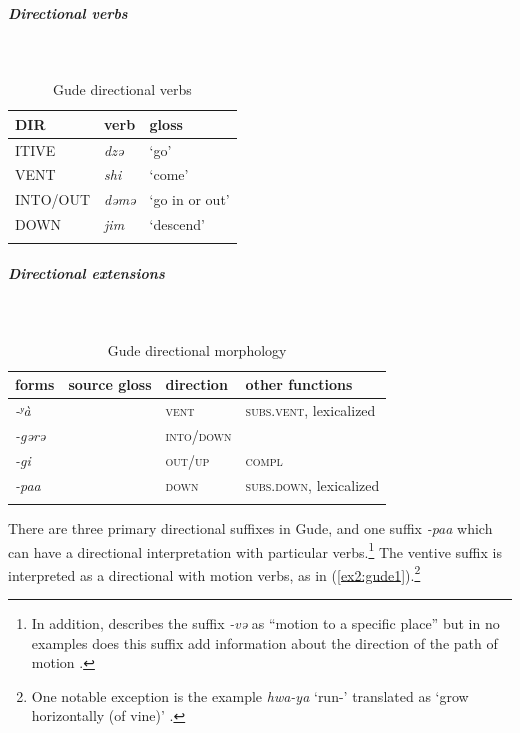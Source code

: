 \subparagraph{Directional verbs}~

\begin{table}[H]
	\caption{Gude directional verbs} 
	\label{tab:gude}
	\begin{tabular}{lll} %
		\lsptoprule
		DIR & verb & gloss   \\ %
		\midrule
		ITIVE & \textit{dzə} & `go' \\
		VENT & \textit{shi} & `come' \\
		INTO/OUT & \textit{dəmə} & `go in or out' \\
		DOWN & \textit{jim} & `descend' \\
		\lspbottomrule
	\end{tabular}
\end{table}

\subparagraph{Directional extensions}~

\begin{table}[H]
	\caption{Gude directional morphology}
	\label{tab:gudeV}
	\begin{tabular}{llll} %
		\lsptoprule
		forms & source gloss & direction  & other functions  \\ %
		\midrule
		\textit{-ʸà}  &   & \textsc{vent}   &   \textsc{subs.vent}, lexicalized  \\
		\textit{-gərə}  &    &   \textsc{into/down} &   \\
		\textit{-gi}  &   &   \textsc{out/up}  &  \textsc{compl}   \\
		\textit{-paa}  &   & \textsc{down}   &  \textsc{subs.down}, lexicalized  \\
		\lspbottomrule
	\end{tabular}
\end{table} 

There are three primary directional suffixes in Gude, and one suffix \textit{-paa} which can have a directional interpretation with particular verbs.\footnote{In addition, \citet[99]{hoskinsonGrammarDictionaryGude1983} describes the suffix \textit{-və} as ``motion to a specific place'' but in no examples does this suffix add information about the direction of the path of motion \citep[cf.][360--361]{schuhChadicCornucopia2017}.} The ventive suffix is interpreted as a directional with motion verbs, as in (\ref{ex2:gude1}).\footnote{One notable exception is the example \textit{hwa-ya} `run-' translated as `grow horizontally (of vine)' \citep[203]{hoskinsonGrammarDictionaryGude1983}.} 

